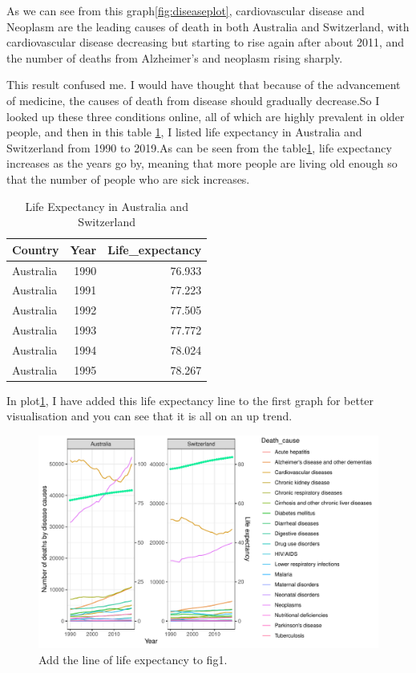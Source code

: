 \documentclass[11pt,a4paper,]{article}
\begin{document}
As we can see from this graph\ref{fig:diseaseplot}, cardiovascular disease and Neoplasm are the leading causes of death in both Australia and Switzerland, with cardiovascular disease decreasing but starting to rise again after about 2011, and the number of deaths from Alzheimer's and neoplasm rising sharply.

This result confused me. I would have thought that because of the advancement of medicine, the causes of death from disease should gradually decrease.So I looked up these three conditions online, all of which are highly prevalent in older people, and then in this table \ref{tab:lifeexpendcy}, I listed life expectancy in Australia and Switzerland from 1990 to 2019.As can be seen from the table\ref{tab:lifeexpendcy}, life expectancy increases as the years go by, meaning that more people are living old enough so that the number of people who are sick increases.

\begin{table}

\caption{\label{tab:lifeexpendcy}Life Expectancy in Australia and Switzerland}
\centering
\begin{tabular}[t]{l|r|r}
\hline
Country & Year & Life\_expectancy\\
\hline
Australia & 1990 & 76.933\\
\hline
Australia & 1991 & 77.223\\
\hline
Australia & 1992 & 77.505\\
\hline
Australia & 1993 & 77.772\\
\hline
Australia & 1994 & 78.024\\
\hline
Australia & 1995 & 78.267\\
\hline
\end{tabular}
\end{table}

In plot\ref{fig:diseaseplot1}, I have added this life expectancy line to the first graph for better visualisation and you can see that it is all on an up trend.

\begin{figure}
\centering
\includegraphics{Assignment4_files/figure-latex/diseaseplot1-1.pdf}
\caption{\label{fig:diseaseplot1}Add the line of life expectancy to fig1.}
\end{figure}
\end{document}
